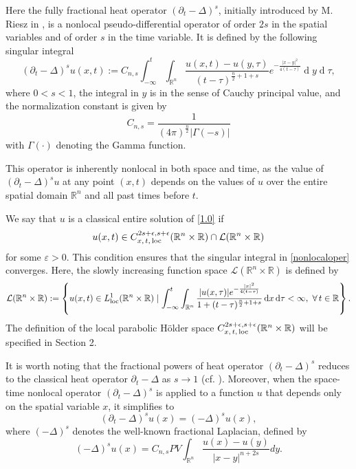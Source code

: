 \documentclass[12pt]{article}
\theoremstyle{remark}
\numberwithin{equation}{section}
\begin{document}
Here the fully fractional heat operator $(\partial_t-\Delta)^s$, initially introduced by M. Riesz in \cite{Riesz}, is a nonlocal pseudo-differential operator of order $2s$ in the spatial variables and of order $s$ in the time variable. It is defined by the following singular integral
\begin{equation}\label{nonlocaloper}
(\partial_t-\Delta)^s u(x,t)
:=C_{n,s}\int_{-\infty}^{t}\int_{\mathbb{R}^n}
  \frac{u(x,t)-u(y,\tau)}{(t-\tau)^{\frac{n}{2}+1+s}}e^{-\frac{|x-y|^2}{4(t-\tau)}}\operatorname{d}\!y\operatorname{d}\!\tau,
\end{equation}
where $0<s<1$, the integral in $y$ is in the sense of Cauchy principal value, and
the normalization constant is given by $$C_{n,s}=\frac{1}{(4\pi)^{\frac{n}{2}}|\Gamma(-s)|}$$
with $\Gamma(\cdot)$ denoting the Gamma function.

This operator is inherently nonlocal in both space and time, as the value of $(\partial_t-\Delta)^s u$ at any point $(x,t)$ depends on the values of $u$ over the entire spatial domain $\mathbb{R}^n$ and all past times before $t$.

We say that $u$ is a classical entire solution of \eqref{1.0} if
 $$u(x,t)\in C^{2s+\epsilon,s+\epsilon}_{x,\, t,\, {\rm loc}}(\mathbb{R}^n\times\mathbb{R}) \cap \mathcal{L}(\mathbb{R}^n\times\mathbb{R})$$
for some $\varepsilon >0$.
This condition ensures that the singular integral in \eqref{nonlocaloper} converges. Here,
the slowly increasing function space $\mathcal{L}(\mathbb{R}^n\times\mathbb{R})$ is defined by
$$ \mathcal{L}(\mathbb{R}^n\times\mathbb{R}):=\left\{u(x,t) \in L^1_{\rm loc} (\mathbb{R}^n\times\mathbb{R}) \mid \int_{-\infty}^t \int_{\mathbb{R}^n} \frac{|u(x,\tau)|e^{-\frac{|x|^2}{4(t-\tau)}}}{1+(t-\tau)^{\frac{n}{2}+1+s}}\operatorname{d}\!x\operatorname{d}\!\tau<\infty,\,\, \forall \,t\in\mathbb{R}\right\}.$$
The definition of the local parabolic H\"{o}lder space $C^{2s+\epsilon,s+\epsilon}_{x,\, t,\, {\rm loc}}(\mathbb{R}^n\times\mathbb{R})$ will be specified in Section 2.

It is worth noting that the fractional powers of heat operator $(\partial_t-\Delta)^s$
reduces to the classical heat operator $\partial_t-\Delta$ as $s\rightarrow 1$ (cf. \cite{FNW}). Moreover,
when the space-time nonlocal operator $(\partial_t-\Delta)^s$ is applied to a function $u$ that depends only on the spatial variable $x$, it simplifies to
 \begin{equation*}
   (\partial_t-\Delta)^s u(x)=(-\Delta)^s u(x),
 \end{equation*}
where $(-\Delta)^s$ denotes the well-known fractional Laplacian, defined by
$$ (-\Delta)^s u(x)=C_{n, s}PV \int_{\mathbb{R}^n}\frac{u(x)-u(y)}{|x-y|^{n+2s}}dy.$$
\end{document}
